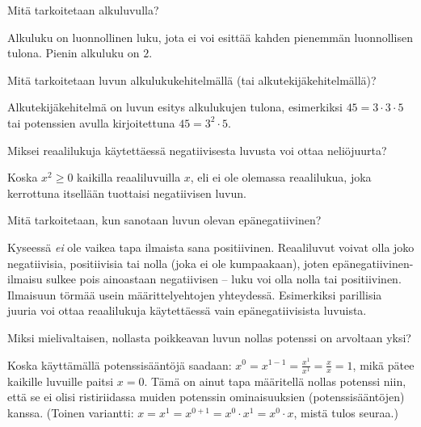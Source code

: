 \begin{tehtava}
Mitä tarkoitetaan alkuluvulla?
\begin{vastaus}
Alkuluku on luonnollinen luku, jota ei voi esittää kahden pienemmän luonnollisen tulona. Pienin alkuluku on $2$. %
\end{vastaus}
\end{tehtava}

\begin{tehtava}
Mitä tarkoitetaan luvun alkulukukehitelmällä (tai alkutekijäkehitelmällä)?
\begin{vastaus}
Alkutekijäkehitelmä on luvun esitys alkulukujen tulona, esimerkiksi $45=3\cdot 3 \cdot 5$ tai potenssien avulla kirjoitettuna $45=3^2\cdot 5$.
\end{vastaus}
\end{tehtava}

\begin{tehtava}
Miksei reaalilukuja käytettäessä negatiivisesta luvusta voi ottaa neliöjuurta?
\begin{vastaus}
Koska $x^2 \geq 0$ kaikilla reaaliluvuilla $x$, eli ei ole olemassa reaalilukua, joka kerrottuna itsellään tuottaisi negatiivisen luvun.
\end{vastaus}
\end{tehtava}

\begin{tehtava}
Mitä tarkoitetaan, kun sanotaan luvun olevan epänegatiivinen?
\begin{vastaus}
Kyseessä \textit{ei} ole vaikea tapa ilmaista sana positiivinen. Reaaliluvut voivat olla joko negatiivisia, positiivisia tai nolla (joka ei ole kumpaakaan), joten epänegatiivinen-ilmaisu sulkee pois ainoastaan negatiivisen -- luku voi olla nolla tai positiivinen. Ilmaisuun törmää usein määrittelyehtojen yhteydessä. Esimerkiksi parillisia juuria voi ottaa reaalilukuja käytettäessä vain epänegatiivisista luvuista.
\end{vastaus}
\end{tehtava}

\begin{tehtava}
Miksi mielivaltaisen, nollasta poikkeavan luvun nollas potenssi on arvoltaan yksi?
\begin{vastaus}
Koska käyttämällä potenssisääntöjä saadaan: $x^0=x^{1-1}=\frac{x^1}{x^1}=\frac{x}{x}=1$, mikä pätee kaikille luvuille paitsi $x=0$. Tämä on ainut tapa määritellä nollas potenssi niin, että se ei olisi ristiriidassa muiden potenssin ominaisuuksien (potenssisääntöjen) kanssa. (Toinen variantti: $x=x^1=x^{0+1}=x^0 \cdot x^1 = x^0 \cdot x$, mistä tulos seuraa.)
\end{vastaus}
\end{tehtava}

